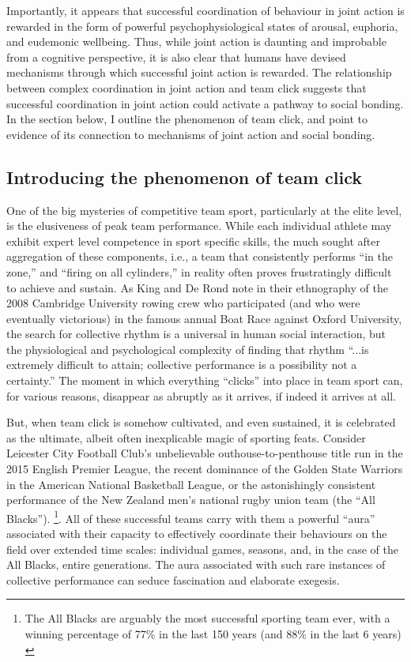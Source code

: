 \begin{CJK}{UTF8}{gbsn}
Importantly, it appears that successful coordination of behaviour in joint action is rewarded in the form of powerful psychophysiological states of arousal, euphoria, and eudemonic wellbeing.  Thus, while joint action is daunting and improbable from a cognitive perspective, it is also clear that humans have devised mechanisms through which successful joint action is rewarded. The relationship between complex coordination in joint action and team click suggests that successful coordination in joint action could activate a pathway to social bonding.  In the section below, I outline the phenomenon of team click, and point to evidence of its connection to mechanisms of joint action and social bonding.


\subsection{Introducing the phenomenon of team click\label{sect:teamClickIntro}}

One of the big mysteries of competitive team sport, particularly at the elite level, is the elusiveness of peak team performance.  While each individual athlete may exhibit expert level competence in sport specific skills, the much sought after aggregation of these components, i.e., a team that consistently performs ``in the zone,'' and ``firing on all cylinders,'' in reality often proves frustratingly difficult to achieve and sustain.  As King and De Rond \textcite[568]{King2011} note in their ethnography of the 2008 Cambridge University rowing crew who participated (and who were eventually victorious) in the famous annual Boat Race against Oxford University, the search for collective rhythm is a universal in human social interaction, but  the physiological and psychological complexity of finding that rhythm ``...is extremely difficult to attain; collective performance is a possibility not a certainty.''   The moment in which everything ``clicks'' into place in team sport can, for various reasons, disappear as abruptly as it arrives, if indeed it arrives at all.

But, when team click is somehow cultivated, and even sustained, it is celebrated as the ultimate, albeit often inexplicable magic of sporting feats. Consider Leicester City Football Club's unbelievable outhouse-to-penthouse title run in the 2015 English Premier League, the recent dominance of the Golden State Warriors in the American National Basketball League, or the astonishingly consistent performance of the New Zealand men's national rugby union team (the ``All Blacks'').
    \footnote{The All Blacks are arguably the most successful sporting team ever, with a winning percentage of 77\% in the last 150 years (and 88\% in the last 6 years) \citep{Kerr2013}}.
All of these successful teams carry with them a powerful ``aura'' associated with their capacity to effectively coordinate their behaviours on the field over extended time scales: individual games, seasons, and, in the case of the All Blacks, entire generations.  The aura associated with such rare instances of collective performance can seduce fascination and elaborate exegesis.


\end{CJK}
